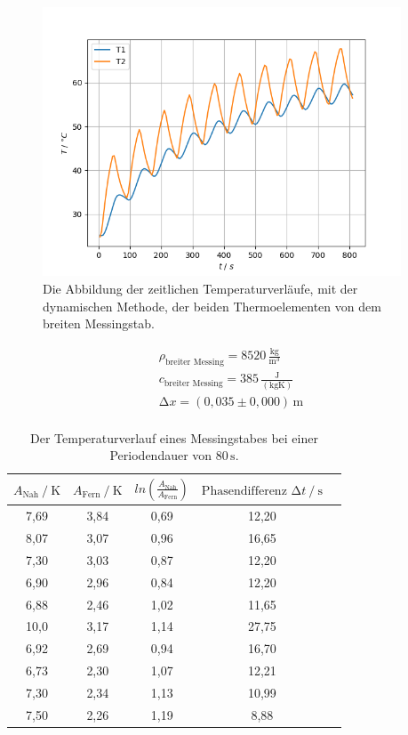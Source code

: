\begin{figure}[H]
    \centering
    \includegraphics[height=80mm]{bilder/TemprVerlDyT1T2.png}
    \caption{Die Abbildung der zeitlichen Temperaturverläufe, mit der dynamischen Methode, der beiden Thermoelementen von dem breiten Messingstab.\label{Abbildung6} }
\end{figure}

\begin{align*}
    \rho_{\text{breiter Messing}} = 8520\,\frac{\unit{\kilo\gram}}{\unit{\meter^3}}\\
    c_{\text{breiter Messing}} = 385\, \frac{\unit{\joule}}{(\unit{\kilo\gram\kelvin})} \\
    \increment x = (0,035 \pm 0,000)\,\unit{\meter}\\
\end{align*}

\begin{table}[H]
    \centering
    \caption{Der Temperaturverlauf eines Messingstabes bei einer Periodendauer von $80\,\unit{\second}$.}
    \label{Tabelle2}
    \begin{tabular} {c     c     c     c     c}
        \toprule
        {$ A_{\text{Nah}}  \mathbin{/} \unit{\kelvin} $} &
        {$ A_{\text{Fern}} \mathbin{/} \unit{\kelvin}$} &
        {$ ln\left(\frac{A_{\text{Nah}}}{A_{\text{Fern}}}\right)$} &
        {$ \text{Phasendifferenz}\,\, \increment t  \mathbin{/} \unit{\second} $} \\
        \midrule
         7,69 & 3,84 & 0,69 & 12,20 \\
         8,07 & 3,07 & 0,96 & 16,65 \\
         7,30 & 3,03 & 0,87 & 12,20 \\
         6,90 & 2,96 & 0,84 & 12,20 \\
         6,88 & 2,46 & 1,02 & 11,65 \\
        10,0 & 3,17 & 1,14 & 27,75 \\
         6,92 & 2,69 & 0,94 & 16,70 \\
         6,73 & 2,30 & 1,07 & 12,21 \\
         7,30 & 2,34 & 1,13 & 10,99 \\
         7,50 & 2,26 & 1,19 &  8,88 \\
        \bottomrule
    \end{tabular} 
\end{table}

